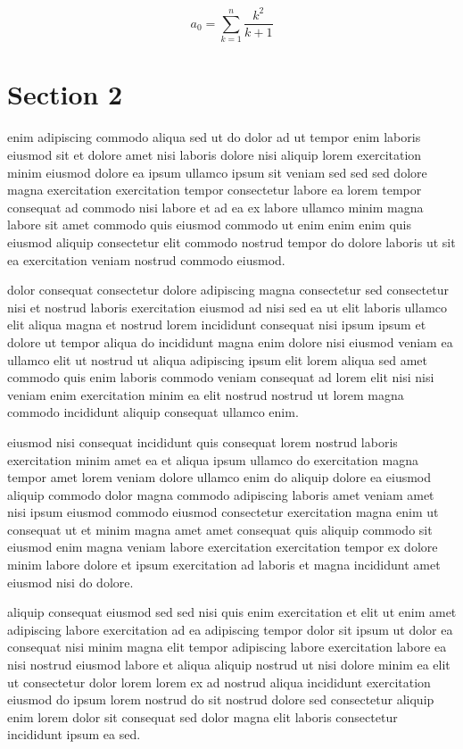 \documentclass{article}
\begin{document}
\begin{equation} a_{0} = \sum_{k=1}^{n} \frac{k^2}{k+1} \end{equation}
\section{Section 2}
enim adipiscing commodo aliqua sed ut do dolor ad ut tempor enim laboris eiusmod sit et dolore amet nisi laboris dolore nisi aliquip lorem exercitation minim eiusmod dolore ea ipsum ullamco ipsum sit veniam sed sed sed dolore magna exercitation exercitation tempor consectetur labore ea lorem tempor consequat ad commodo nisi labore et ad ea ex labore ullamco minim magna labore sit amet commodo quis eiusmod commodo ut enim enim enim quis eiusmod aliquip consectetur elit commodo nostrud tempor do dolore laboris ut sit ea exercitation veniam nostrud commodo eiusmod.

dolor consequat consectetur dolore adipiscing magna consectetur sed consectetur nisi et nostrud laboris exercitation eiusmod ad nisi sed ea ut elit laboris ullamco elit aliqua magna et nostrud lorem incididunt consequat nisi ipsum ipsum et dolore ut tempor aliqua do incididunt magna enim dolore nisi eiusmod veniam ea ullamco elit ut nostrud ut aliqua adipiscing ipsum elit lorem aliqua sed amet commodo quis enim laboris commodo veniam consequat ad lorem elit nisi nisi veniam enim exercitation minim ea elit nostrud nostrud ut lorem magna commodo incididunt aliquip consequat ullamco enim.

eiusmod nisi consequat incididunt quis consequat lorem nostrud laboris exercitation minim amet ea et aliqua ipsum ullamco do exercitation magna tempor amet lorem veniam dolore ullamco enim do aliquip dolore ea eiusmod aliquip commodo dolor magna commodo adipiscing laboris amet veniam amet nisi ipsum eiusmod commodo eiusmod consectetur exercitation magna enim ut consequat ut et minim magna amet amet consequat quis aliquip commodo sit eiusmod enim magna veniam labore exercitation exercitation tempor ex dolore minim labore dolore et ipsum exercitation ad laboris et magna incididunt amet eiusmod nisi do dolore.

aliquip consequat eiusmod sed sed nisi quis enim exercitation et elit ut enim amet adipiscing labore exercitation ad ea adipiscing tempor dolor sit ipsum ut dolor ea consequat nisi minim magna elit tempor adipiscing labore exercitation labore ea nisi nostrud eiusmod labore et aliqua aliquip nostrud ut nisi dolore minim ea elit ut consectetur dolor lorem lorem ex ad nostrud aliqua incididunt exercitation eiusmod do ipsum lorem nostrud do sit nostrud dolore sed consectetur aliquip enim lorem dolor sit consequat sed dolor magna elit laboris consectetur incididunt ipsum ea sed.
\end{document}
